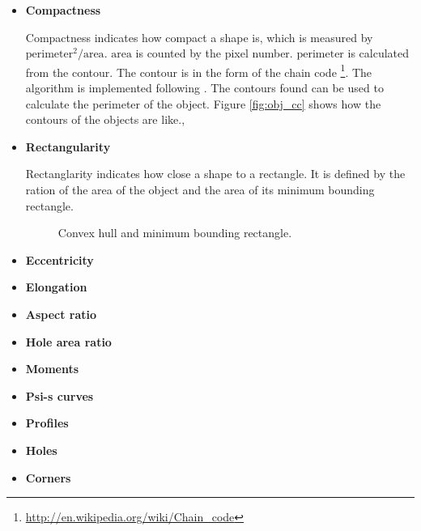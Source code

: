 \documentclass[paper=a4, fontsize=11pt]{scrartcl}
\begin{document}
\begin{itemize}
\item \textbf{Compactness} 

Compactness indicates how compact a shape is, which is measured by $ \mbox{perimeter}^{2} / \mbox{area} $.
$ \mbox{area} $ is counted by the pixel number.
$ \mbox{perimeter} $ is calculated from the contour. 
The contour is in the form of the chain code \footnote{\url{http://en.wikipedia.org/wiki/Chain_code}}. 
The algorithm is implemented following \cite{chaincode}.
The contours found can be used to calculate the perimeter of the object.
Figure \ref{fig:obj_cc} shows how the contours of the objects are like.,

\item \textbf{Rectangularity} 

Rectanglarity indicates how close a shape to a rectangle.
It is defined by the ration of the area of the object and the area of its minimum bounding rectangle.

\begin{figure}[h]
\centering
{} 
\caption{Convex hull and minimum bounding rectangle.}
\label{fig:convex_hull_min_bound_box}
\end{figure}

\item \textbf{Eccentricity}



\item \textbf{Elongation}

\item \textbf{Aspect ratio}

\item \textbf{Hole area ratio}

\item \textbf{Moments}

\item \textbf{Psi-s curves}
\item \textbf{Profiles}
\item \textbf{Holes}
\item \textbf{Corners}
\end{itemize}
\end{document}
